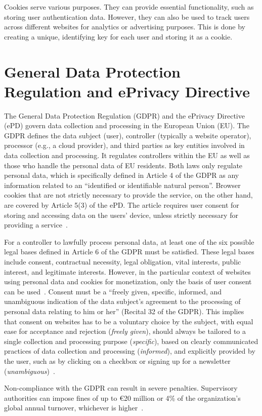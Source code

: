 Cookies serve various purposes. 
They can provide essential functionality, such as storing user authentication data. 
However, they can also be used to track users across different websites for analytics or advertising purposes.
This is done by creating a unique, identifying key for each user and storing it as a cookie.

\section{General Data Protection Regulation and ePrivacy Directive} \label{sec:legal}
The General Data Protection Regulation (GDPR) and the ePrivacy Directive (ePD) govern data collection and processing in the European Union (EU).
The GDPR defines the data subject (user), controller (typically a website operator), processor (e.g., a cloud provider), and third parties as key entities involved in data collection and processing.
It regulates controllers within the EU as well as those who handle the personal data of EU residents.
Both laws only regulate personal data, which is specifically defined in Article 4 of the GDPR as any information related to an \enquote{identified or identifiable natural person}.
Browser cookies that are not strictly necessary to provide the service, on the other hand, are covered by Article 5(3) of the ePD.
The article requires user consent for storing and accessing data on the users' device, unless strictly necessary for providing a service~\cite{kubicek2024phd}.

For a controller to lawfully process personal data, at least one of the six possible legal bases defined in Article 6 of the GDPR must be satisfied.
These legal bases include consent, contractual necessity, legal obligation, vital interests, public interest, and legitimate interests.
However, in the particular context of websites using personal data and cookies for monetization, only the basis of user consent can be used~\cite{kubicek2024phd}.
Consent must be a \enquote{freely given, specific, informed, and unambiguous indication of the data subject's agreement to the processing of personal data relating to him or her} (Recital 32 of the GDPR).
This implies that consent on websites has to be a voluntary choice by the subject, with equal ease for acceptance and rejection (\emph{freely given}), should always be tailored to a single collection and processing purpose (\emph{specific}), based on clearly communicated practices of data collection and processing (\emph{informed}), and explicitly provided by the user, such as by clicking on a checkbox or signing up for a newsletter (\emph{unambiguous})~\cite{kubicek2024phd}.

Non-compliance with the GDPR can result in severe penalties. 
Supervisory authorities can impose fines of up to €20 million or 4\% of the organization's global annual turnover, whichever is higher~\cite{sanchez_rola2019can}. 
